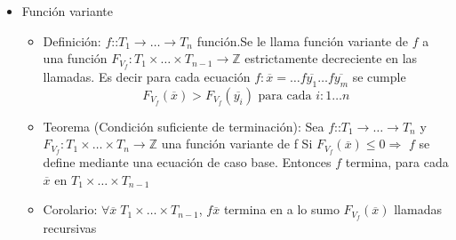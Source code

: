 \documentclass[a4paper,10pt]{article}
\begin{document}
\begin{itemize}
\begin{itemize}
	\end{itemize}
	\item Función variante
	\begin{itemize}
	   \item Definición: $f$::$T_1 \longrightarrow \dots \longrightarrow T_n$ función.Se le llama función variante de $f$ a una función $F_{V_f} : T_1 \times \dots \times T_{n-1} \longrightarrow \mathbb{Z}$ estrictamente decreciente en las llamadas. Es decir para cada ecuación $f: \overline{x} = \dots f \overline{y_1} \dots f \overline{y_m}$ se cumple $$F_{V_f}(\overline{x}) > F_{V_f}(\overline{y_i}) \mbox{ para cada } i:1 \dots n$$
	   \item Teorema (Condición suficiente de terminación): Sea $f$::$T_1 \longrightarrow \dots \longrightarrow T_n$ y $F_{V_f} : T_1 \times \dots \times T_n \longrightarrow \mathbb{Z}$ una función variante de f
	   	\subitem Si $F_{V_f}(\overline{x}) \leq 0 \Rightarrow$ $f$ se define mediante una ecuación de caso base.
		Entonces $f$ termina, para cada $\overline{x}$ en $T_1 \times \dots \times T_{n-1}$
	    \item Corolario: $\forall \overline{x} \; T_1 \times \dots \times T_{n-1}$, $f \overline{x}$ termina en a lo sumo $F_{V_f}(\overline{x})$ llamadas recursivas
	\end{itemize}
    \end{itemize}
\end{document}
